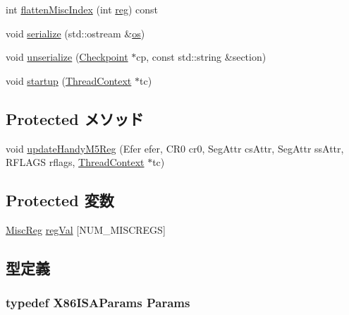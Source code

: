 \begin{DoxyCompactItemize}
\item 
int \hyperlink{classX86ISA_1_1ISA_a8997760aa4425793911f57440a4dd8ae}{flattenMiscIndex} (int \hyperlink{namespaceX86ISA_aeeb02ad833ab76f3430553ef93213a6b}{reg}) const 
\item 
void \hyperlink{classX86ISA_1_1ISA_a53e036786d17361be4c7320d39c99b84}{serialize} (std::ostream \&\hyperlink{namespaceX86ISA_a6b6e6ba763e7eaf46ac5b6372ca98d30}{os})
\item 
void \hyperlink{classX86ISA_1_1ISA_af22e5d6d660b97db37003ac61ac4ee49}{unserialize} (\hyperlink{classCheckpoint}{Checkpoint} $\ast$cp, const std::string \&section)
\item 
void \hyperlink{classX86ISA_1_1ISA_a769e733729615c529fdb54f538f11dba}{startup} (\hyperlink{classThreadContext}{ThreadContext} $\ast$tc)
\end{DoxyCompactItemize}
\subsection*{Protected メソッド}
\begin{DoxyCompactItemize}
\item 
void \hyperlink{classX86ISA_1_1ISA_a9ce2f376c572f07e3cc0851492e1ca25}{updateHandyM5Reg} (Efer efer, CR0 cr0, SegAttr csAttr, SegAttr ssAttr, RFLAGS rflags, \hyperlink{classThreadContext}{ThreadContext} $\ast$tc)
\end{DoxyCompactItemize}
\subsection*{Protected 変数}
\begin{DoxyCompactItemize}
\item 
\hyperlink{namespaceX86ISA_aa16539aa6584fd12f7d6fa868f75b4de}{MiscReg} \hyperlink{classX86ISA_1_1ISA_a33fdce9a7f1c2a99683c4ef6fda1e32a}{regVal} \mbox{[}NUM\_\-MISCREGS\mbox{]}
\end{DoxyCompactItemize}


\subsection{型定義}
\hypertarget{classX86ISA_1_1ISA_a479c84ea8074d124d1ddd320ef027439}{
\subsubsection[{Params}]{\setlength{\rightskip}{0pt plus 5cm}typedef X86ISAParams {\bf Params}}}
\label{classX86ISA_1_1ISA_a479c84ea8074d124d1ddd320ef027439}


